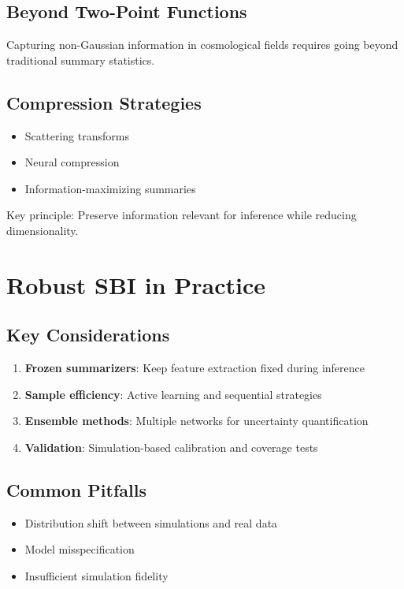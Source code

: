 \documentclass[11pt,a4paper]{article}
\theoremstyle{definition}
\begin{document}
\subsection{Beyond Two-Point Functions}
Capturing non-Gaussian information in cosmological fields requires going beyond traditional summary statistics.

\subsection{Compression Strategies}
\begin{itemize}
    \item Scattering transforms
    \item Neural compression
    \item Information-maximizing summaries
\end{itemize}

Key principle: Preserve information relevant for inference while reducing dimensionality.

\section{Robust SBI in Practice}

\subsection{Key Considerations}
\begin{enumerate}
    \item \textbf{Frozen summarizers}: Keep feature extraction fixed during inference
    \item \textbf{Sample efficiency}: Active learning and sequential strategies
    \item \textbf{Ensemble methods}: Multiple networks for uncertainty quantification
    \item \textbf{Validation}: Simulation-based calibration and coverage tests
\end{enumerate}

\subsection{Common Pitfalls}
\begin{itemize}
    \item Distribution shift between simulations and real data
    \item Model misspecification
    \item Insufficient simulation fidelity
\end{itemize}
\end{document}
